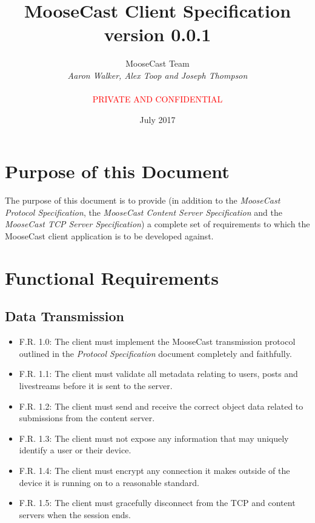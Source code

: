 \documentclass[12pt, a4paper]{article}
\begin{document}
\title{\textbf{MooseCast Client Specification \\ version 0.0.1}}
\author{MooseCast Team \\ \textit{Aaron Walker, Alex Toop and Joseph Thompson} \\ \\ \textcolor{red}{PRIVATE AND CONFIDENTIAL}}
\date{July 2017}
\maketitle

\tableofcontents
\clearpage

\section{Purpose of this Document}
The purpose of this document is to provide (in addition to the \textit{MooseCast Protocol Specification}, the \textit{MooseCast Content Server Specification} and the \textit{MooseCast TCP Server Specification}) a complete set of requirements to which the MooseCast client application is to be developed against.

\section{Functional Requirements}
\subsection{Data Transmission}
\begin{itemize}
\item F.R. 1.0: The client must implement the MooseCast transmission protocol outlined in the \textit{Protocol Specification} document completely and faithfully.
\item F.R. 1.1: The client must validate all metadata relating to users, posts and livestreams before it is sent to the server.
\item F.R. 1.2: The client must send and receive the correct object data related to submissions from the content server.
\item F.R. 1.3: The client must not expose any information that may uniquely identify a user or their device.
\item F.R. 1.4: The client must encrypt any connection it makes outside of the device it is running on to a reasonable standard.
\item F.R. 1.5: The client must gracefully disconnect from the TCP and content servers when the session ends.
\end{itemize}
\end{document}
